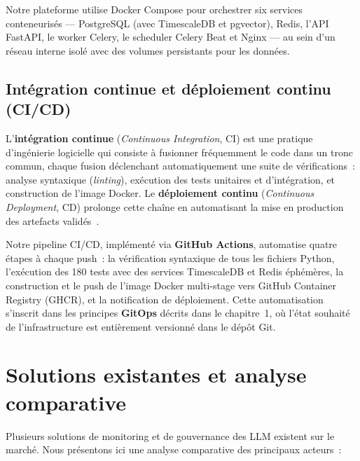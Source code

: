 Notre plateforme utilise Docker Compose pour orchestrer six services conteneurisés --- PostgreSQL (avec TimescaleDB et pgvector), Redis, l'API FastAPI, le worker Celery, le scheduler Celery Beat et Nginx --- au sein d'un réseau interne isolé avec des volumes persistants pour les données.

\subsection{Intégration continue et déploiement continu (CI/CD)}

L'\textbf{intégration continue} (\textit{Continuous Integration}, CI) est une pratique d'ingénierie logicielle qui consiste à fusionner fréquemment le code dans un tronc commun, chaque fusion déclenchant automatiquement une suite de vérifications~: analyse syntaxique (\textit{linting}), exécution des tests unitaires et d'intégration, et construction de l'image Docker. Le \textbf{déploiement continu} (\textit{Continuous Deployment}, CD) prolonge cette chaîne en automatisant la mise en production des artefacts validés~\cite{ford2017}.

Notre pipeline CI/CD, implémenté via \textbf{GitHub Actions}, automatise quatre étapes à chaque push~: la vérification syntaxique de tous les fichiers Python, l'exécution des 180 tests avec des services TimescaleDB et Redis éphémères, la construction et le push de l'image Docker multi-stage vers GitHub Container Registry (GHCR), et la notification de déploiement. Cette automatisation s'inscrit dans les principes \textbf{GitOps} décrits dans le chapitre~1, où l'état souhaité de l'infrastructure est entièrement versionné dans le dépôt Git.


\section{Solutions existantes et analyse comparative}
\label{sec:comparatif}

Plusieurs solutions de monitoring et de gouvernance des LLM existent sur le marché. Nous présentons ici une analyse comparative des principaux acteurs~:

